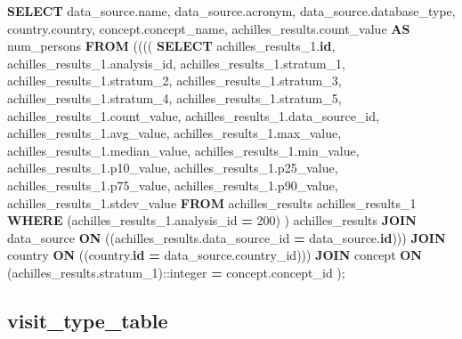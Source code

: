 \documentclass[
]{book}
\newenvironment{Shaded}{\begin{snugshade}}{\end{snugshade}}
\newcommand{\CharTok}[1]{\textcolor[rgb]{0.31,0.60,0.02}{#1}}
\newcommand{\DecValTok}[1]{\textcolor[rgb]{0.00,0.00,0.81}{#1}}
\newcommand{\KeywordTok}[1]{\textcolor[rgb]{0.13,0.29,0.53}{\textbf{#1}}}
\newcommand{\NormalTok}[1]{#1}
\newcommand{\OperatorTok}[1]{\textcolor[rgb]{0.81,0.36,0.00}{\textbf{#1}}}
\begin{document}
\begin{Shaded}
\begin{Highlighting}[]
\KeywordTok{SELECT}\NormalTok{ data\_source.name,}
\NormalTok{   data\_source.acronym,}
\NormalTok{   data\_source.database\_type,}
\NormalTok{   country.country,}
\NormalTok{   concept.concept\_name,}
\NormalTok{   achilles\_results.count\_value }\KeywordTok{AS}\NormalTok{ num\_persons}
  \KeywordTok{FROM}\NormalTok{ (((( }\KeywordTok{SELECT}\NormalTok{ achilles\_results\_1.}\KeywordTok{id}\NormalTok{,}
\NormalTok{           achilles\_results\_1.analysis\_id,}
\NormalTok{           achilles\_results\_1.stratum\_1,}
\NormalTok{           achilles\_results\_1.stratum\_2,}
\NormalTok{           achilles\_results\_1.stratum\_3,}
\NormalTok{           achilles\_results\_1.stratum\_4,}
\NormalTok{           achilles\_results\_1.stratum\_5,}
\NormalTok{           achilles\_results\_1.count\_value,}
\NormalTok{           achilles\_results\_1.data\_source\_id,}
\NormalTok{           achilles\_results\_1.avg\_value,}
\NormalTok{           achilles\_results\_1.max\_value,}
\NormalTok{           achilles\_results\_1.median\_value,}
\NormalTok{           achilles\_results\_1.min\_value,}
\NormalTok{           achilles\_results\_1.p10\_value,}
\NormalTok{           achilles\_results\_1.p25\_value,}
\NormalTok{           achilles\_results\_1.p75\_value,}
\NormalTok{           achilles\_results\_1.p90\_value,}
\NormalTok{           achilles\_results\_1.stdev\_value}
          \KeywordTok{FROM}\NormalTok{ achilles\_results achilles\_results\_1}
         \KeywordTok{WHERE}\NormalTok{ (achilles\_results\_1.analysis\_id }\OperatorTok{=} \DecValTok{200}\NormalTok{)}
\NormalTok{         ) achilles\_results}
    \KeywordTok{JOIN}\NormalTok{ data\_source}
      \KeywordTok{ON}\NormalTok{ ((achilles\_results.data\_source\_id }\OperatorTok{=}\NormalTok{ data\_source.}\KeywordTok{id}\NormalTok{)))}
    \KeywordTok{JOIN}\NormalTok{ country }\KeywordTok{ON}\NormalTok{ ((country.}\KeywordTok{id} \OperatorTok{=}\NormalTok{ data\_source.country\_id)))}
    \KeywordTok{JOIN}\NormalTok{ concept}
      \KeywordTok{ON}
\NormalTok{        (achilles\_results.stratum\_1):}\CharTok{:integer}
        \OperatorTok{=}
\NormalTok{        concept.concept\_id}
\NormalTok{        );}
\end{Highlighting}
\end{Shaded}

\hypertarget{visit_type_table}{%
\subsection*{visit\_type\_table}\label{visit_type_table}}
\end{document}
